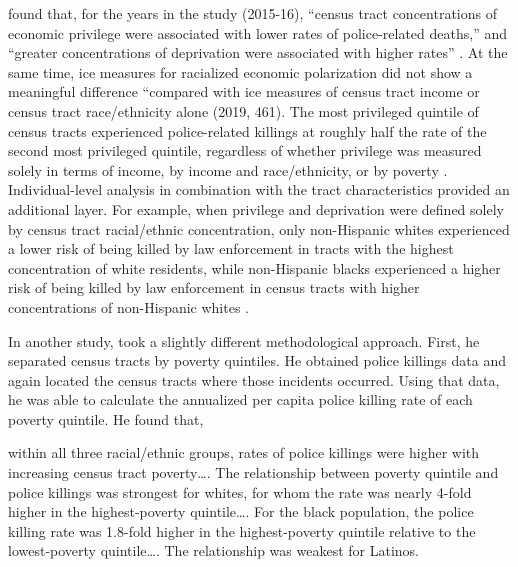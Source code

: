 \documentclass[12pt]{article}
\renewenvironment{quote}
  {\list{}{\leftmargin=\parindent\rightmargin=0pt}%
   \item\relax}
  {\endlist}
\begin{document}
\citeauthor{feldmanPoliceRelatedDeathsNeighborhood2019} found that, for the years in the study (2015-16), “census tract concentrations of economic privilege were associated with lower rates of police-related deaths,” and “greater concentrations of deprivation were associated with higher rates” \parencite*[461]{feldmanPoliceRelatedDeathsNeighborhood2019}. At the same time, \acrshort{ice} measures for racialized economic polarization did not show a meaningful difference “compared with \acrshort{ice} measures of census tract income or census tract race/ethnicity alone (2019, 461). The most privileged quintile of census tracts experienced police-related killings at roughly half the rate of the second most privileged quintile, regardless of whether privilege was measured solely in terms of income, by income and race/ethnicity, or by poverty \parencite*[461]{feldmanPoliceRelatedDeathsNeighborhood2019}. Individual-level analysis in combination with the tract characteristics provided an additional layer. For example, when privilege and deprivation were defined solely by census tract racial/ethnic concentration, only non-Hispanic whites experienced a lower risk of being killed by law enforcement in tracts with the highest concentration of white residents, while non-Hispanic blacks experienced a higher risk of being killed by law enforcement in census tracts with higher concentrations of non-Hispanic whites \parencite*[461]{feldmanPoliceRelatedDeathsNeighborhood2019}.

In another study, \textcite{feldmanPoliceKillingsUS2020} took a slightly different methodological approach. First, he separated census tracts by poverty quintiles. He obtained police killings data and again located the census tracts where those incidents occurred. Using that data, he was able to calculate the annualized per capita police killing rate of each poverty quintile. He found that,

\begin{quote}
within all three racial/ethnic groups, rates of police killings were higher with increasing census tract poverty…. The relationship between poverty quintile and police killings was strongest for whites, for whom the rate was nearly 4-fold higher in the highest-poverty quintile…. For the black population, the police killing rate was 1.8-fold higher in the highest-poverty quintile relative to the lowest-poverty quintile…. The relationship was weakest for Latinos. \parencite{feldmanPoliceKillingsUS2020}
\end{quote}
\end{document}
